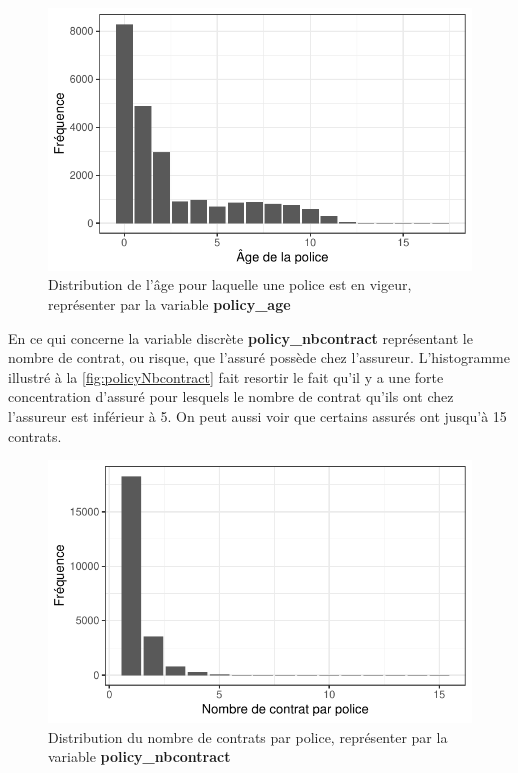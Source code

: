 \documentclass[
]{article}
\begin{document}
\begin{figure}

{\centering \includegraphics{01-01-Pretraitement_files/figure-latex/graph_policy_age-1} 

}

\caption{\label{fig:policyAge}Distribution de l'âge pour laquelle une police est en vigeur, représenter par la variable \textbf{policy\_age}}\label{fig:graph_policy_age}
\end{figure}

En ce qui concerne la variable discrète \textbf{policy\_nbcontract}
représentant le nombre de contrat, ou risque, que l'assuré possède chez
l'assureur. L'histogramme illustré à la \autoref{fig:policyNbcontract}
fait resortir le fait qu'il y a une forte concentration d'assuré pour
lesquels le nombre de contrat qu'ils ont chez l'assureur est inférieur à
5. On peut aussi voir que certains assurés ont jusqu'à 15 contrats.

\begin{figure}

{\centering \includegraphics{01-01-Pretraitement_files/figure-latex/graph_policy_nbcontract-1} 

}

\caption{\label{fig:policyNbcontract}Distribution du nombre de contrats par police, représenter par la variable \textbf{policy\_nbcontract}}\label{fig:graph_policy_nbcontract}
\end{figure}
\end{document}
